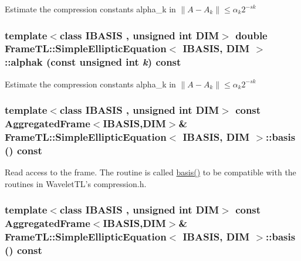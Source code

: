 Estimate the compression constants alpha\_\-k in $\|A-A_k\| \leq \alpha_k 2^{-sk}$ \hypertarget{classFrameTL_1_1SimpleEllipticEquation_aa99066841e723261103f2e7354eff92}{
\subsubsection[{alphak}]{\setlength{\rightskip}{0pt plus 5cm}template$<$class IBASIS , unsigned int DIM$>$ double {\bf FrameTL::SimpleEllipticEquation}$<$ IBASIS, DIM $>$::alphak (const unsigned int {\em k}) const}}
\label{classFrameTL_1_1SimpleEllipticEquation_aa99066841e723261103f2e7354eff92}


Estimate the compression constants alpha\_\-k in $\|A-A_k\| \leq \alpha_k 2^{-sk}$ \hypertarget{classFrameTL_1_1SimpleEllipticEquation_b0d14a3117004cec09cca7b665c962d0}{
\subsubsection[{basis}]{\setlength{\rightskip}{0pt plus 5cm}template$<$class IBASIS , unsigned int DIM$>$ const {\bf AggregatedFrame}$<$IBASIS,DIM$>$\& {\bf FrameTL::SimpleEllipticEquation}$<$ IBASIS, DIM $>$::basis () const}}
\label{classFrameTL_1_1SimpleEllipticEquation_b0d14a3117004cec09cca7b665c962d0}


Read access to the frame. The routine is called \hyperlink{classFrameTL_1_1SimpleEllipticEquation_b0d14a3117004cec09cca7b665c962d0}{basis()} to be compatible with the routines in WaveletTL's compression.h. \hypertarget{classFrameTL_1_1SimpleEllipticEquation_b0d14a3117004cec09cca7b665c962d0}{
\subsubsection[{basis}]{\setlength{\rightskip}{0pt plus 5cm}template$<$class IBASIS , unsigned int DIM$>$ const {\bf AggregatedFrame}$<$IBASIS,DIM$>$\& {\bf FrameTL::SimpleEllipticEquation}$<$ IBASIS, DIM $>$::basis () const}}
\label{classFrameTL_1_1SimpleEllipticEquation_b0d14a3117004cec09cca7b665c962d0}


